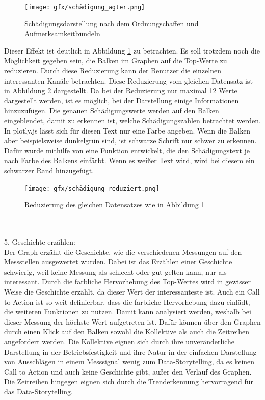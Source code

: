 \begin{figure}[!h]
    \centering
    \texttt{[image: gfx/schädigung\_agter.png]}
    \caption{Schädigungsdarstellung nach dem Ordnungschaffen und Aufmerksamkeitbündeln}
    \label{fig:schaedigung_after}
\end{figure}
\noindent
Dieser Effekt ist deutlich in Abbildung \ref{fig:schaedigung_after} zu betrachten. Es soll trotzdem noch die Möglichkeit gegeben sein, die Balken im Graphen auf die Top-Werte zu reduzieren. Durch diese Reduzierung kann der Benutzer die einzelnen interessanten Kanäle betrachten. Diese Reduzierung vom gleichen Datensatz ist in Abbildung \ref{fig:schädigung_reduziert} dargestellt. Da bei der Reduzierung nur maximal 12 Werte dargestellt werden, ist es möglich, bei der Darstellung einige Informationen hinzuzufügen. Die genauen Schädigungswerte werden auf den Balken eingeblendet, damit zu erkennen ist, welche Schädigungszahlen betrachtet werden. In plotly.js lässt sich für diesen Text nur eine Farbe angeben. Wenn die Balken aber beispielsweise dunkelgrün sind, ist schwarze Schrift nur schwer zu erkennen. Dafür wurde mithilfe von \cite{Alnitak.2012} eine Funktion entwickelt, die den Schädigungstext je nach Farbe des Balkens einfärbt. Wenn es weißer Text wird, wird bei diesem ein schwarzer Rand hinzugefügt.
\begin{figure}[!h]
    \centering
    \texttt{[image: gfx/schädigung\_reduziert.png]}
    \caption{Reduzierung des gleichen Datensatzes wie in Abbildung \ref{fig:schaedigung_after}}
    \label{fig:schädigung_reduziert}
\end{figure}
\\\\5. Geschichte erzählen:\\
Der Graph erzählt die Geschichte, wie die verschiedenen Messungen auf den Messstellen ausgewertet wurden. Dabei ist das Erzählen einer Geschichte  schwierig, weil keine Messung als schlecht oder gut gelten kann, nur als interessant. Durch die farbliche Hervorhebung des Top-Wertes wird in gewisser Weise die Geschichte erzählt, da dieser Wert der interessanteste ist. Auch ein Call to Action ist so weit definierbar, dass die farbliche Hervorhebung dazu einlädt, die weiteren Funktionen zu nutzen. Damit kann analysiert werden, weshalb bei dieser Messung der höchste Wert aufgetreten ist. Dafür können über den Graphen durch einen Klick auf den Balken sowohl die Kollektive als auch die Zeitreihen angefordert werden. Die Kollektive eignen sich durch ihre unveränderliche Darstellung in der Betriebsfestigkeit \cite{Gotz.2020} und ihre Natur in der einfachen Darstellung von Ausschlägen in einem Messsignal \cite{PatrickPfeiffer.17.10.2022}  wenig zum Data-Storytelling, da es keinen Call to Action und auch keine Geschichte gibt, außer den Verlauf des Graphen. Die Zeitreihen hingegen eignen sich durch die Trenderkennung hervorragend für das Data-Storytelling.
